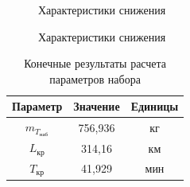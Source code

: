 \begin{figure}[H]
    \caption{Характеристики снижения}
    \label{fig:Характеристики Спуска1}
\end{figure}

\begin{figure}[H]
    \caption{Характеристики снижения}
    \label{fig:Характеристики Спуска2}
\end{figure}

\begin{table}[H]
    \centering
    \caption{Конечные результаты расчета параметров набора}
    \begin{tabular}{|c|c|c|}
    \hline
        Параметр & Значение &Единицы\\ \hline
        $m_{T_\text{наб}}$ & 756,936&кг\\ \hline
        $L_\text{кр}$ & 314,16 & км\\ \hline
        $T_\text{кр}$ & 41,929 & мин\\ \hline
    \end{tabular}
    \label{tab:Крейсер}
\end{table}

